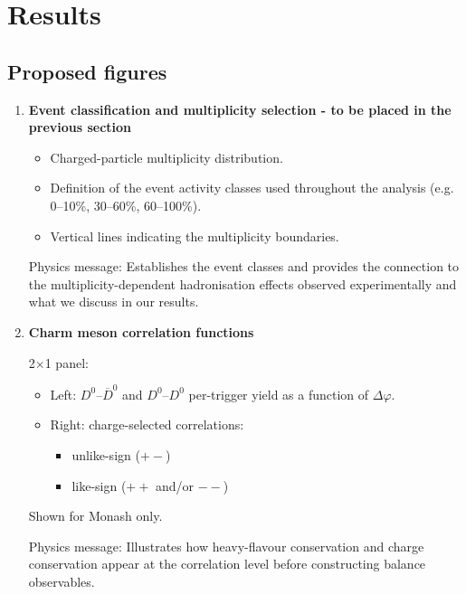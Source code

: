 \section{Results}
\label{Sec:Results}


\subsection{Proposed figures}

\begin{enumerate}

\item \textbf{Event classification and multiplicity selection - to be placed in the previous section}

\begin{itemize}
\item Charged-particle multiplicity distribution.
\item Definition of the event activity classes used throughout the analysis (e.g. 0--10\%, 30--60\%, 60--100\%).
\item Vertical lines indicating the multiplicity boundaries.
\end{itemize}

Physics message:
Establishes the event classes and provides the connection to the multiplicity-dependent hadronisation effects observed experimentally and what we discuss in our results.







\vspace{0.5cm}

\item \textbf{Charm meson correlation functions}

2$\times$1 panel:

\begin{itemize}
\item Left: $D^0$--$\overline{D}^0$ and $D^0$--$D^0$ per-trigger yield as a function of $\Delta\varphi$.
\item Right: charge-selected correlations:
\begin{itemize}
\item unlike-sign ($+-$)
\item like-sign ($++$ and/or $--$)
\end{itemize}
\end{itemize}

Shown for Monash only.

Physics message:
Illustrates how heavy-flavour conservation and charge conservation appear at the correlation level before constructing balance observables.


\end{enumerate}
